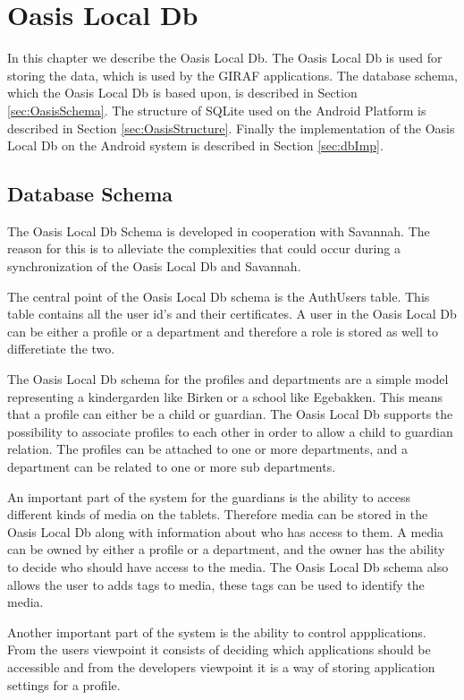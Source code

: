 \chapter{Oasis Local Db}
\label{ch:Db}
In this chapter we describe the Oasis Local Db.
The Oasis Local Db is used for storing the data, which is used by the GIRAF applications.
The database schema, which the Oasis Local Db is based upon, is described in Section \vref{sec:OasisSchema}.
The structure of SQLite used on the Android Platform is described in Section \vref{sec:OasisStructure}.
Finally the implementation of the Oasis Local Db on the Android system is described in Section \vref{sec:dbImp}.

\section{Database Schema}
\label{sec:OasisSchema}
The Oasis Local Db Schema is developed in cooperation with Savannah.
The reason for this is to alleviate the complexities that could occur during a synchronization of the Oasis Local Db and Savannah.

The central point of the Oasis Local Db schema is the AuthUsers table.
This table contains all the user id's and their certificates.
A user in the Oasis Local Db can be either a profile or a department and therefore a role is stored as well to differetiate the two.

The Oasis Local Db schema for the profiles and departments are a simple model representing a kindergarden like Birken or a school like Egebakken.
This means that a profile can either be a child or guardian.
The Oasis Local Db supports the possibility to associate profiles to each other in order to allow a child to guardian relation.
The profiles can be attached to one or more departments, and a department can be related to one or more sub departments.

An important part of the system for the guardians is the ability to access different kinds of media on the tablets.
Therefore media can be stored in the Oasis Local Db along with information about who has access to them.
A media can be owned by either a profile or a department, and the owner has the ability to decide who should have access to the media.
The Oasis Local Db schema also allows the user to adds tags to media, these tags can be used to identify the media.

Another important part of the system is the ability to control appplications.
From the users viewpoint it consists of deciding which applications should be accessible and from the developers viewpoint it is a way of storing application settings for a profile.

